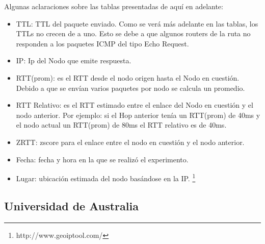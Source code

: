 Algunas aclaraciones sobre las tablas presentadas de aquí en adelante:
\begin{itemize}
\item TTL: TTL del paquete enviado. Como se verá más adelante en las tablas, los TTLs no crecen de a uno. Esto se debe a que algunos routers de la ruta no responden a los paquetes ICMP del tipo Echo Request.
\item IP: Ip del Nodo que emite respuesta.
\item RTT(prom): es el RTT desde el nodo origen hasta el Nodo en cuestión. Debido a que se envían varios paquetes por nodo se calcula un promedio.
\item RTT Relativo: es el RTT estimado entre el enlace del Nodo en cuestión y el nodo anterior. Por ejemplo: si el Hop anterior tenía un RTT(prom) de 40ms y el nodo actual un RTT(prom) de 80ms el RTT relativo es de 40ms.
\item ZRTT: zscore para el enlace entre el nodo en cuestión y el nodo anterior.
\item Fecha: fecha y hora en la que se realizó el experimento.
\item Lugar: ubicación estimada del nodo basándose en la IP. \footnote{http://www.geoiptool.com/}
\end{itemize}

\subsection{Universidad de Australia}

